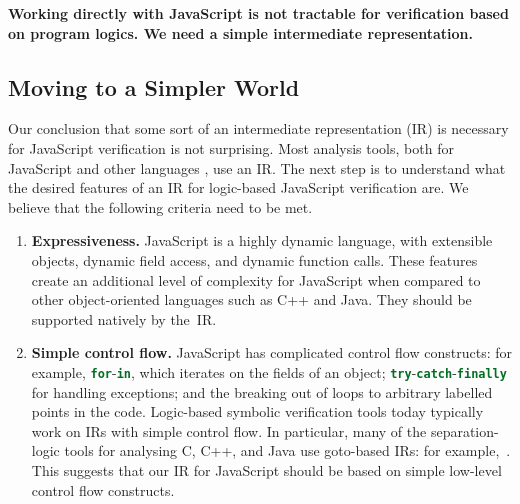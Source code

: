 \documentclass{llncs}
\def\jsinline{\lstinline[language=JavaScript, basicstyle=\small]}
\begin{document}
\begin{center}
{\bfseries \small
Working directly with JavaScript is not tractable for verification
based on program logics.
We need  a simple intermediate representation. }
\end{center}

\subsection{Moving to a Simpler World} 
\label{subsec:simpler}








Our conclusion that some sort of an intermediate representation (IR)
is necessary for JavaScript verification is not surprising. Most
analysis tools, both for JavaScript \cite{guha:ecoop:2010,s5,kashyap:fse:14,jensen:sas:2009,andreasen:oopsla:2014,sridharan:ecoop:12} and other languages \cite{smallf,slayerp,jstar,jacobs2011verifast,abductor,calcagno2015moving,wala}, use an IR.
The next step is to  understand what the desired features of an
IR for logic-based JavaScript verification are. 
We believe that the following  criteria need to be met.

\begin{enumerate}
\setlength{\itemsep}{1mm}
\item {\bfseries Expressiveness.}  JavaScript is a highly dynamic
  language, with extensible objects, dynamic field access, and dynamic
  function calls. These features create an additional level of
  complexity for JavaScript when compared to other object-oriented
  languages such as C++ and Java. They should be supported  natively by the~IR.
\item {\bfseries Simple control flow.} JavaScript has complicated
  control flow constructs:
for example, \jsinline|for|-\jsinline|in|, which iterates on the
fields of an object;
 \jsinline|try|-\jsinline|catch|-\jsinline|finally| for handling
 exceptions;
and the breaking out of loops to arbitrary labelled points in the code.
Logic-based symbolic verification tools today typically work on
IRs with 
simple control flow. In particular, many of the separation-logic tools for
analysing C, C++, and Java use goto-based IRs: for example,~\cite{smallf,slayerp,jstar,jacobs2011verifast,abductor,calcagno2015moving}. This suggests that our IR for JavaScript should be based
on simple low-level control flow constructs.
\end{enumerate}
\end{document}

